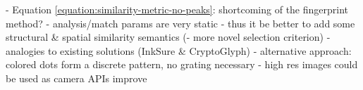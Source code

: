 \documentclass[thesis.tex]{subfiles}
\begin{document}

- Equation \ref{equation:similarity-metric-no-peaks}: shortcoming of the fingerprint method?
  - analysis/match params are very static
- thus it be better to add some structural \& spatial similarity semantics (- more novel selection criterion) - analogies to existing solutions (InkSure \& CryptoGlyph)
  - alternative approach: colored dots form a discrete pattern, no grating necessary
- high res images could be used as camera APIs improve
\end{document}
